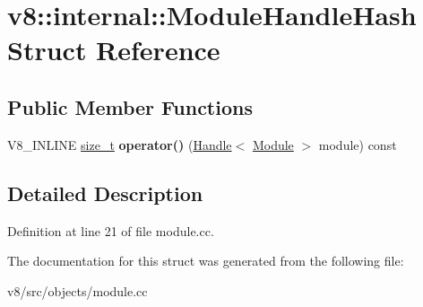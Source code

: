 \hypertarget{structv8_1_1internal_1_1ModuleHandleHash}{}\section{v8\+:\+:internal\+:\+:Module\+Handle\+Hash Struct Reference}
\label{structv8_1_1internal_1_1ModuleHandleHash}
\subsection*{Public Member Functions}
\begin{DoxyCompactItemize}
\item 
\mbox{\label{structv8_1_1internal_1_1ModuleHandleHash_af1202aa4c8e3c8471574aa02f95ce5e0}} 
V8\+\_\+\+I\+N\+L\+I\+NE \mbox{\hyperlink{classsize__t}{size\+\_\+t}} {\bfseries operator()} (\mbox{\hyperlink{classv8_1_1internal_1_1Handle}{Handle}}$<$ \mbox{\hyperlink{classv8_1_1internal_1_1Module}{Module}} $>$ module) const
\end{DoxyCompactItemize}


\subsection{Detailed Description}


Definition at line 21 of file module.\+cc.



The documentation for this struct was generated from the following file\+:\begin{DoxyCompactItemize}
\item 
v8/src/objects/module.\+cc\end{DoxyCompactItemize}
